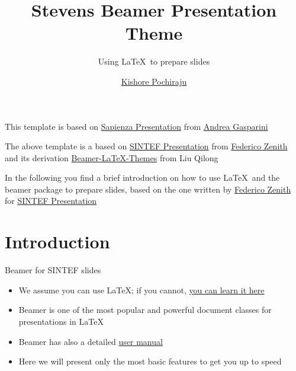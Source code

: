 \documentclass{beamer}
\title{Stevens Beamer Presentation Theme}
\subtitle{Using \LaTeX\ to prepare slides}
\author{\href{mailto:dont@email.me}{Kishore Pochiraju}}
\newcommand{\hrefcol}[2]{\textcolor{cyan}{\href{#1}{#2}}}
\begin{document}
\maketitle

\begin{frame}
	
	This template is based on \hrefcol{https://www.overleaf.com/latex/templates/sapienza-presentation/yyksmrskffhk}{Sapienza Presentation} from \hrefcol{mailto:andrea@gasparini.cloud}{Andrea Gasparini}
	
\vspace{\baselineskip}

The above template is a based on \hrefcol{https://www.overleaf.com/latex/templates/sintef-presentation/jhbhdffczpnx}{SINTEF Presentation} from \hrefcol{mailto:federico.zenith@sintef.no}{Federico Zenith} and its derivation \hrefcol{https://github.com/TOB-KNPOB/Beamer-LaTeX-Themes}{Beamer-LaTeX-Themes} from Liu Qilong

\vspace{\baselineskip}

In the following you find a brief introduction on how to use \LaTeX\ and the beamer package to prepare slides, based on the one written by \hrefcol{mailto:federico.zenith@sintef.no}{Federico Zenith} for \hrefcol{https://www.overleaf.com/latex/templates/sintef-presentation/jhbhdffczpnx}{SINTEF Presentation}



\end{frame}

\section{Introduction}

\begin{frame}{Beamer for SINTEF slides}
\begin{itemize}
\item We assume you can use \LaTeX; if you cannot,
\hrefcol{http://en.wikibooks.org/wiki/LaTeX/}{you can learn it here}
\item Beamer is one of the most popular and powerful document
classes for presentations in \LaTeX
\item Beamer has also a detailed
\hrefcol{http://www.ctan.org/tex-archive/macros/latex/contrib/beamer/doc/beameruserguide.pdf}{user
 manual}
\item Here we will present only the most basic features to get you up to speed
\end{itemize}
\end{frame}
\end{document}
